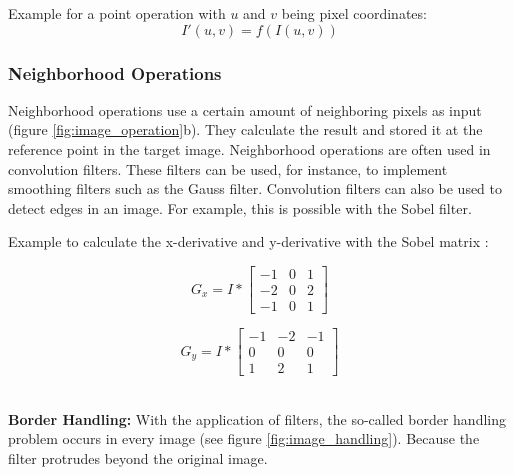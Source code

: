 Example for a point operation with $u$ and $v$ being pixel coordinates:
\begin{equation}
    I'(u, v) = f(I(u, v))
    \label{eq:point_operation}
\end{equation}


\subsubsection*{Neighborhood Operations} \label{ch:th:neighborhood}
Neighborhood operations use a certain amount of neighboring pixels as input (figure \ref{fig:image_operation}b).
They calculate the result and stored it at the reference point in the target
image. Neighborhood operations are often used in convolution filters. These
filters can be used, for instance, to implement smoothing filters such as the
Gauss filter. Convolution filters can also be used to detect edges in an image. For example, this is possible with the Sobel filter.

Example to calculate the x-derivative and y-derivative with the Sobel matrix \cite{sobel_matrix}:

\noindent\begin{minipage}{.5\linewidth}
\begin{equation}
    G_{x} = I * \begin{bmatrix}
                -1 & 0 & 1 \\ 
                -2 & 0 & 2 \\ 
                -1 & 0 & 1
                \end{bmatrix}
    \label{eq:neighborhood_operation}
\end{equation}

\end{minipage}%
\begin{minipage}{.5\linewidth}

\begin{equation}
    G_{y} = I * \begin{bmatrix}
                -1 & -2 & -1 \\ 
                0 & 0 & 0 \\ 
                1 & 2 & 1
                \end{bmatrix}
    \label{eq:neighborhood_operation}
\end{equation} 

\end{minipage}\\


\textbf{Border Handling:}
With the application of filters, the so-called border handling problem occurs in every image (see figure \ref{fig:image_handling}). Because the filter protrudes beyond the original image.

